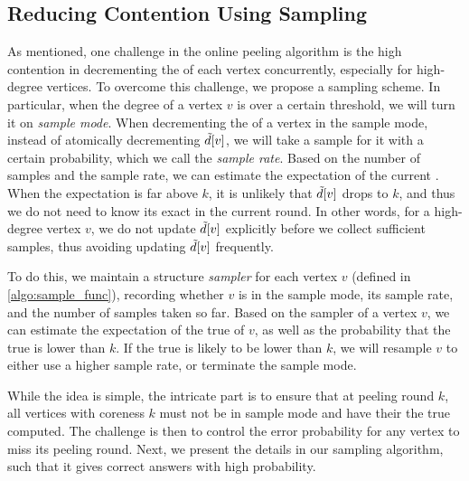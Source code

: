 \subsection{Reducing Contention Using Sampling}\label{sec:sampling}


As mentioned, one challenge in the online peeling algorithm is the high contention 
in decrementing the \induceddegree{} of each vertex concurrently, especially for high-degree vertices.
To overcome this challenge, we propose a sampling scheme. 
In particular, when the degree of a vertex $v$ is over a certain threshold, 
we will turn it on \emph{sample mode}. 
When decrementing the \induceddegree{} of a vertex in the sample mode,
instead of atomically decrementing $\tilde{d}[v]$, 
we will take a sample for it with a certain probability, which we call the \emph{sample rate}. %
Based on the number of samples and the sample rate, we can estimate the expectation of the current \induceddegree{}.
When the expectation is far above $k$, it is unlikely that $\tilde{d}[v]$ drops to $k$,
and thus we do not need to know its exact \induceddegree{} in the current round. 
In other words, for a high-degree vertex $v$, we do not update $\tilde{d}[v]$ explicitly before we collect sufficient samples, 
thus avoiding updating $\tilde{d}[v]$ frequently. 

To do this, we maintain a structure \emph{sampler} for each vertex $v$ (defined in \cref{algo:sample_func}), recording whether $v$ is in the sample mode, its sample rate, and the number of samples taken so far. 
Based on the sampler of a vertex $v$, we can estimate the expectation of the true \induceddegree{} of $v$,
as well as the probability that the true \induceddegree{} is lower than $k$. 
If the true \induceddegree{} is likely to be lower than $k$, 
we will resample $v$ to either use a higher sample rate,
or terminate the sample mode. 

While the idea is simple, the intricate part is to ensure that at peeling round $k$, all vertices with coreness $k$ must not be in sample mode and have their the true  computed. 
The challenge is then to control the error probability for any vertex to miss its peeling round. 
Next, we present the details in our sampling algorithm, such that it gives correct answers with high probability. 

